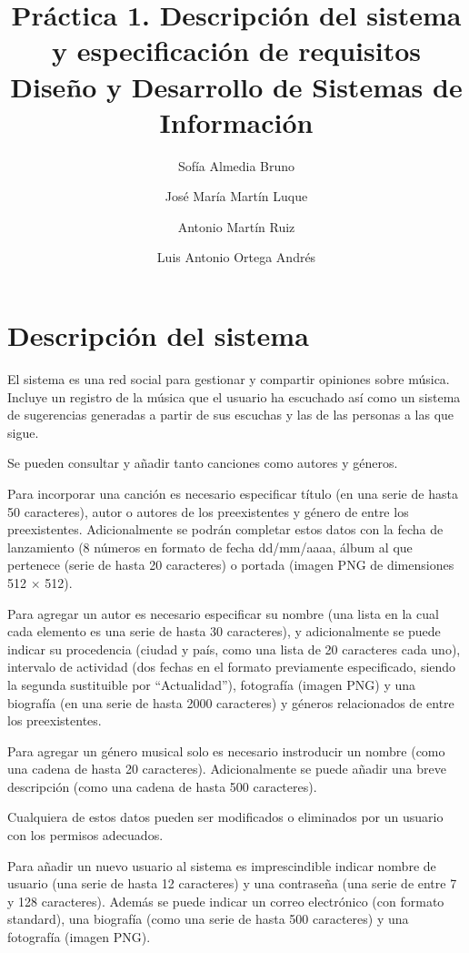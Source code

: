 \documentclass[
  12pt,
  a4paper,
  DIV=12,
  spanish,
]{scrartcl}
\title{Práctica 1. Descripción del sistema y especificación de requisitos \\\large Diseño y Desarrollo de Sistemas de Información}
\author{Sofía Almedia Bruno \and José María Martín Luque \and Antonio Martín Ruiz \and Luis Antonio Ortega Andrés}
\begin{document}
\maketitle

\section{Descripción del sistema} %

El sistema es una red social para gestionar y compartir opiniones sobre música. Incluye un registro de la música que el usuario ha escuchado así como un sistema de sugerencias generadas a partir de sus escuchas y las de las personas a las que sigue.

Se pueden consultar y añadir tanto canciones como autores y géneros.

Para incorporar una canción es necesario especificar título (en una serie de hasta 50 caracteres), autor o autores de los preexistentes y género de entre los preexistentes. Adicionalmente se podrán completar estos datos con la fecha de lanzamiento (8 números en formato de fecha dd/mm/aaaa, álbum al que pertenece (serie de hasta 20 caracteres) o portada (imagen PNG de dimensiones 512 $\times$ 512).

Para agregar un autor es necesario especificar su nombre (una lista en la cual cada elemento es una serie de hasta 30 caracteres), y adicionalmente se puede indicar su procedencia (ciudad y país, como una lista de 20 caracteres cada uno), intervalo de actividad (dos fechas en el formato previamente especificado, siendo la segunda sustituible por ``Actualidad''), fotografía (imagen PNG) y una biografía (en una serie de hasta 2000 caracteres) y géneros relacionados de entre los preexistentes.

Para agregar un género musical solo es necesario instroducir un nombre (como una cadena de hasta 20 caracteres). Adicionalmente se puede añadir una breve descripción (como una cadena de hasta 500 caracteres).

Cualquiera de estos datos pueden ser modificados o eliminados por un usuario con los permisos adecuados.


Para añadir un nuevo usuario al sistema es imprescindible indicar nombre de usuario (una serie de hasta 12 caracteres) y una contraseña (una serie de entre 7 y 128 caracteres). Además se puede indicar un correo electrónico (con formato standard), una biografía (como una serie de hasta 500 caracteres) y una fotografía (imagen PNG).
\end{document}

